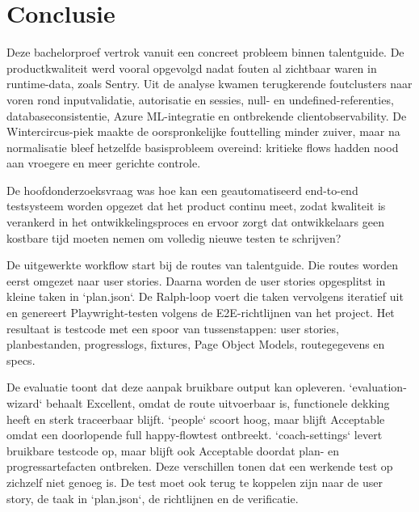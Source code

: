
\chapter{Conclusie}%
\label{ch:conclusie}


Deze bachelorproef vertrok vanuit een concreet probleem binnen talentguide. De productkwaliteit werd vooral opgevolgd nadat fouten al zichtbaar waren in runtime-data, zoals Sentry. Uit de analyse kwamen terugkerende foutclusters naar voren rond inputvalidatie, autorisatie en sessies, null- en undefined-referenties, databaseconsistentie, Azure ML-integratie en ontbrekende clientobservability. De Wintercircus-piek maakte de oorspronkelijke fouttelling minder zuiver, maar na normalisatie bleef hetzelfde basisprobleem overeind: kritieke flows hadden nood aan vroegere en meer gerichte controle.

De hoofdonderzoeksvraag was hoe kan een geautomatiseerd end-to-end testsysteem worden opgezet dat het product continu meet, zodat kwaliteit is verankerd in het ontwikkelingsproces en ervoor zorgt dat ontwikkelaars geen kostbare tijd moeten nemen om volledig nieuwe testen te schrijven?

De uitgewerkte workflow start bij de routes van talentguide. Die routes worden eerst omgezet naar user stories. Daarna worden de user stories opgesplitst in kleine taken in `plan.json`. De Ralph-loop voert die taken vervolgens iteratief uit en genereert Playwright-testen volgens de E2E-richtlijnen van het project. Het resultaat is testcode met een spoor van tussenstappen: user stories, planbestanden, progresslogs, fixtures, Page Object Models, routegegevens en specs.

De evaluatie toont dat deze aanpak bruikbare output kan opleveren. `evaluation-wizard` behaalt Excellent, omdat de route uitvoerbaar is, functionele dekking heeft en sterk traceerbaar blijft. `people` scoort hoog, maar blijft Acceptable omdat een doorlopende full happy-flowtest ontbreekt. `coach-settings` levert bruikbare testcode op, maar blijft ook Acceptable doordat plan- en progressartefacten ontbreken. Deze verschillen tonen dat een werkende test op zichzelf niet genoeg is. De test moet ook terug te koppelen zijn naar de user story, de taak in `plan.json`, de richtlijnen en de verificatie.

